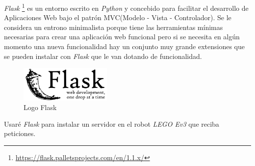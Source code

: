 \textit{Flask} \footnote{\url{https://flask.palletsprojects.com/en/1.1.x/}} es un entorno escrito en \textit{Python} y concebido para facilitar el desarrollo de Aplicaciones Web bajo el patrón MVC(Modelo - Vista - Controlador). Se le considera un entrono minimalista porque tiene las herramientas  mínimas necesarias para crear una aplicación web funcional pero si se necesita en algún momento una nueva funcionalidad hay un conjunto muy grande extensiones  que se pueden instalar con \textit{Flask} que le van dotando de funcionalidad.
\begin{figure}[h!]
  \centering
    \includegraphics[width=0.4\textwidth]{img/flask.png}
  \caption{Logo Flask}
  \label{Flask}
\end{figure}

Usaré \textit{Flask} para instalar un servidor en el robot \textit{LEGO Ev3} que reciba peticiones.